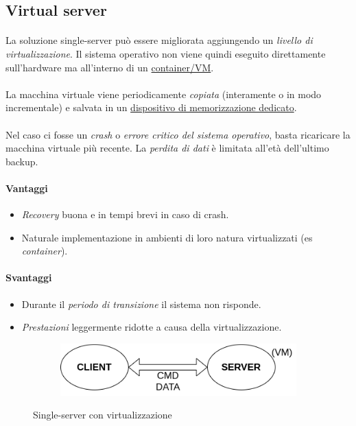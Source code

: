 \documentclass[11pt,a4paper,english]{article}
\begin{document}
\subsection{Virtual server}

\paragraph{} La soluzione single-server può essere migliorata aggiungendo un \emph{livello di virtualizzazione}. Il sistema operativo non viene quindi eseguito direttamente sull'hardware ma all'interno di un \underline{container/VM}. 

\paragraph{} La macchina virtuale viene periodicamente \emph{copiata} (interamente o in modo incrementale) e salvata in un \underline{dispositivo di memorizzazione dedicato}. 

\paragraph{} Nel caso ci fosse un \emph{crash} o \emph{errore critico del sistema operativo}, basta ricaricare la macchina virtuale più recente. La \emph{perdita di dati} è limitata all'età dell'ultimo backup. 

\paragraph{Vantaggi} \begin{itemize}
	\item \emph{Recovery} buona e in tempi brevi in caso di crash.
	\item Naturale implementazione in ambienti di loro natura virtualizzati (es \emph{container}).
\end{itemize}


\paragraph{Svantaggi} \begin{itemize}
	\item Durante il \emph{periodo di transizione} il sistema non risponde.
	\item \emph{Prestazioni} leggermente ridotte a causa della virtualizzazione.
\end{itemize}

\begin{figure}[H]
	\centering
	\begin{subfigure}{0.60\linewidth}
		\includegraphics[width=\linewidth]{../diagrams/architettura/2.png}
	\end{subfigure}
	\caption{Single-server con virtualizzazione}
\end{figure}
\end{document}
